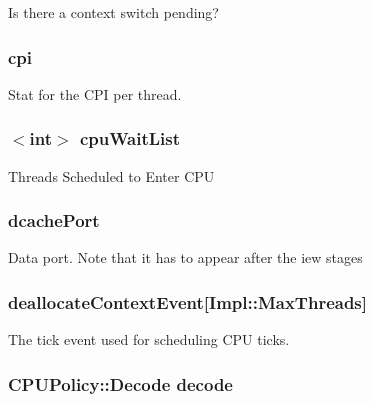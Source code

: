 \label{classFullO3CPU_a4fd841dc8d29605dc13a120cc5a9b438}
Is there a context switch pending? \hypertarget{classFullO3CPU_af68d211cace2daa3df90471d7af93ad8}{
\subsubsection[{cpi}]{ {\bf cpi}}}
\label{classFullO3CPU_af68d211cace2daa3df90471d7af93ad8}
Stat for the CPI per thread. \hypertarget{classFullO3CPU_a11435331f730084ec731d6f88c255290}{
\subsubsection[{cpuWaitList}]{$<$int$>$ {\bf cpuWaitList}}}
\label{classFullO3CPU_a11435331f730084ec731d6f88c255290}
Threads Scheduled to Enter CPU \hypertarget{classFullO3CPU_a38b03978ad7720fdc910ff6a8b44585f}{
\subsubsection[{dcachePort}]{ {\bf dcachePort}}}
\label{classFullO3CPU_a38b03978ad7720fdc910ff6a8b44585f}
Data port. Note that it has to appear after the iew stages \hypertarget{classFullO3CPU_aaf8ffd47de062d6900cb500a3caccdb5}{
\subsubsection[{deallocateContextEvent}]{ {\bf deallocateContextEvent}\mbox{[}Impl::MaxThreads\mbox{]}}}
\label{classFullO3CPU_aaf8ffd47de062d6900cb500a3caccdb5}
The tick event used for scheduling CPU ticks. \hypertarget{classFullO3CPU_a21ddb57c5e4f70298cee97ee543e3bdb}{
\subsubsection[{decode}]{\setlength{\rightskip}{0pt plus 5cm}CPUPolicy::Decode {\bf decode}}}
